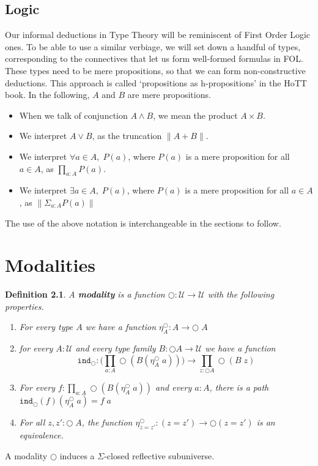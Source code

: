\documentclass[12pt]{report}
\newtheorem{defn}[thm]{Definition}
\begin{document}
\section{Logic}
Our informal deductions in Type Theory will be reminiscent of First Order Logic ones. 
To be able to use a similar verbiage, we will set down a handful of types, corresponding to the connectives that let us form well-formed formulas in FOL. 
These types need to be mere propositions, so that we can form non-constructive deductions. 
This approach is called `propositions as h-propositions' in the HoTT book. 
In the following, $A$ and $B$ are mere propositions.
\begin{itemize}
\item When we talk of conjunction $A \wedge B$, we mean the product $A \times B$. 
\item We interpret $A \vee B$, as the truncation $\| A + B\|$.
\item We interpret $\forall a\in A,\; P(a)$, where $P(a)$ is a mere proposition for all $a \in A$, as $\prod_{a : A}P(a)$. 
\item We interpret $ \exists a \in A,\; P(a)$, where $P(a)$ is a mere proposition for all $a \in A$, as $\| \Sigma_{a : A} P(a) \|$
\end{itemize}
The use of the above notation is interchangeable in the sections to follow.


\chapter{Modalities}
\begin{defn}\label{modality_definition}
A \textbf{modality} is a function $\bigcirc : \mathcal{U} \rightarrow \mathcal{U}$ with the following properties.
\begin{enumerate}
	\item For every type $A$ we have a function $\eta_A^\bigcirc : A \rightarrow \bigcirc\; A$
	\item for every $A : \mathcal{U}$ and every type family $B : \bigcirc A \rightarrow \mathcal{U}$ we have a function
	$$\mathtt{ind}_\bigcirc : \Big( \prod_{a : A}\bigcirc (B (\eta_A^\bigcirc\; a)) \Big) \rightarrow \prod_{z : \bigcirc A} \bigcirc (B\; z)$$
	\item For every $f : \prod_{a : A} \bigcirc (B(\eta_A^\bigcirc\; a))$ and every $a : A$, there is a path $\mathtt{ind}_\bigcirc (f)(\eta_A^\bigcirc\; a) = f\; a$
	\item For all $z,z' : \bigcirc \; A$, the function $\eta_{z=z'}^\bigcirc : (z = z') \rightarrow \bigcirc (z = z')$ is an equivalence.

\end{enumerate}
\end{defn}
A modality $\bigcirc$ induces a $\Sigma$-closed reflective subuniverse.
\end{document}
